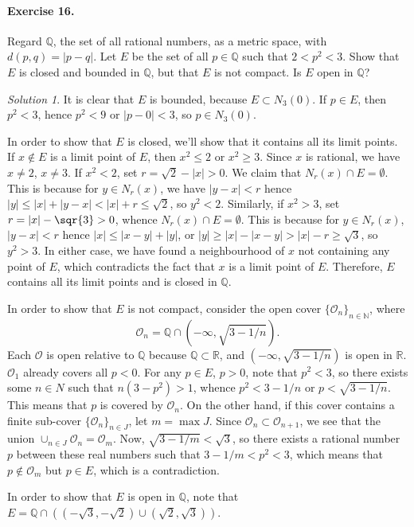 \documentclass[11pt]{report}
\def\R{\mathbb{R}}
\def\Q{\mathbb{Q}}
\def\N{\mathbb{N}}
\def\O{\mathscr{O}}
\theoremstyle{remark}
\newtheorem*{solution}{Solution}
\begin{document}
    \paragraph{Exercise 16.} Regard $\Q$, the set of all rational numbers, as a
    metric space, with $d(p, q) = |p - q|$. Let $E$ be the set of all $p \in \Q$
    such that $2 < p^2 < 3$. Show that $E$ is closed and bounded in $\Q$, but that
    $E$ is not compact. Is $E$ open in $\Q$?
    \begin{solution}
        It is clear that $E$ is bounded, because $E \subset N_3(0)$. If $p \in E$, 
        then $p^2 < 3$, hence $p^2 < 9$ or $|p - 0| < 3$, so $p \in N_3(0)$.

        In order to show that $E$ is closed, we'll show that it contains all its
        limit points. If $x \notin E$ is a limit point of $E$, then $x^2 \leq 2$ or
        $x^2 \geq 3$. Since $x$ is rational, we have $x \neq 2$, $x \neq 3$. If $x^2
        < 2$, set $r = \sqrt{2} - |x| > 0$. We claim that $N_r(x) \cap E =
        \emptyset$. This is because for $y \in N_r(x)$, we have $|y - x| < r$ hence
        $|y| \leq |x| + |y - x| < |x| + r \leq \sqrt{2}$, so $y^2 < 2$. Similarly,
        if $x^2 > 3$, set $r = |x| - \sqr{3} > 0$, whence $N_r(x) \cap E =
        \emptyset$. This is because for $y \in N_r(x)$, $|y - x| < r$ hence $|x|
        \leq |x - y| + |y|$, or $|y| \geq |x| - |x - y| > |x| - r \geq \sqrt{3}$, so
        $y^2 > 3$. In either case, we have found a neighbourhood of $x$ not
        containing any point of $E$, which contradicts the fact that $x$ is a limit
        point of $E$. Therefore, $E$ contains all its limit points and is closed in
        $\Q$.

        In order to show that $E$ is not compact, consider the open cover
        $\{\O_n\}_{n \in \N}$, where \[
            \O_n = \Q \cap (-\infty, \sqrt{3 - 1 / n}).
        \] Each $\O$ is open relative to $\Q$ because $\Q \subset \R$, and
        $(-\infty, \sqrt{3 - 1 / n})$ is open in $\R$. $\O_1$ already covers all $p
        < 0$. For any $p \in E$, $p > 0$, note that $p^2 < 3$, so there exists some
        $n \in N$ such that $n(3 - p^2) > 1$, whence $p^2 < 3 - 1 / n$ or $p <
        \sqrt{3 - 1 / n}$. This means that $p$ is covered by $\O_n$.
        On the other hand, if this cover contains a finite sub-cover $\{\O_n\}_{n
        \in J}$, let $m = \max{J}$. Since $\O_n \subset \O_{n + 1}$, we see that the
        union $\cup_{n \in J}\O_n = \O_m$. Now, $\sqrt{3 - 1 / m} < \sqrt{3}$, so
        there exists a rational number $p$ between these real numbers such that $3 -
        1 / m < p^2 < 3$, which means that $p \notin \O_m$ but $p \in E$, which is a
        contradiction.

        In order to show that $E$ is open in $\Q$, note that $E = \Q \cap
        ((-\sqrt{3}, -\sqrt{2}) \cup (\sqrt{2}, \sqrt{3}))$.
    \end{solution}
    
    
\end{document}
